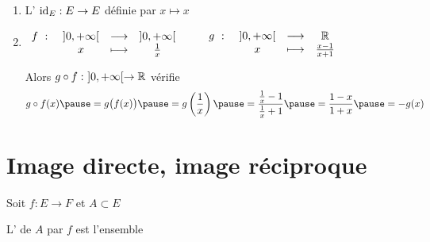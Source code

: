 
\begin{frame}

\begin{exemple}
\begin{enumerate}
  \item L' $\mathop{\text{id}}\nolimits_E : E \to E$ définie par 
$x \mapsto x$

\pause
\bigskip

  \item 
$ \begin {array}{rccc} 
f \ : \ & ]0,+\infty[ &\longrightarrow& ]0,+\infty[ \\ 
        & x & \longmapsto & \frac 1x \\ 
\end{array}  \qquad 
\begin {array}{rccc} 
g \ : \ & ]0,+\infty[ &\longrightarrow& \mathbb{R} \\ 
        & x & \longmapsto & \frac{x-1}{x+1} \\ 
\end{array}
$

\pause
\bigskip

Alors $g \circ f : \ ]0,+\infty[ \to \mathbb{R}$ vérifie 
$$g\circ f(x) 
\pause
= g \big(f(x)\big) 
\pause
= g \left(\frac 1x \right) 
\pause
= \frac{\frac 1x - 1}{\frac 1x + 1} 
\pause
= \frac{1-x}{1+x} 
\pause
= - g(x)$$

\end{enumerate}
\end{exemple}

\end{frame}


\section{Image directe, image réciproque}

\begin{frame}
Soit $f : E \to F$  et  $A \subset E$ 
\begin{mydefinition}
L' de $A$ par $f$ est l'ensemble

\vspace*{-3mm}
\end{mydefinition}
\pause
\hspace*{-10mm}
\vspace*{-6mm}

\end{frame}

